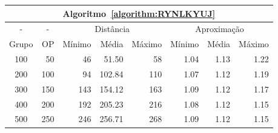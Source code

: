 \begin{table}[!htb]
  \begin{tabular}{|c|r|r|r|r|r|r|r|}
    \hline
    \multicolumn{8}{|c|}{Algoritmo~\ref{algorithm:RYNLKYUJ}}                                                                    \\ \hline
      -      & \multicolumn{1}{c|}{-} & \multicolumn{3}{c|}{Distância}             & \multicolumn{3}{c|}{Aproximação}           \\ \hline
    Grupo    & OP                     & Mínimo       & Média        & Máximo       & Mínimo       & Média        & Máximo       \\ \hline  
    100      & 50                     & 46           & 51.50        & 58           & 1.04         & 1.13         & 1.22         \\ \hline
    200      & 100                    & 94           & 102.84       & 110          & 1.07         & 1.12         & 1.19         \\ \hline
    300      & 150                    & 143          & 154.12       & 163          & 1.09         & 1.12         & 1.17         \\ \hline
    400      & 200                    & 192          & 205.23       & 216          & 1.08         & 1.12         & 1.15         \\ \hline
    500      & 250                    & 246          & 256.71       & 268          & 1.09         & 1.12         & 1.15         \\ \hline    
  \end{tabular}
\end{table}
